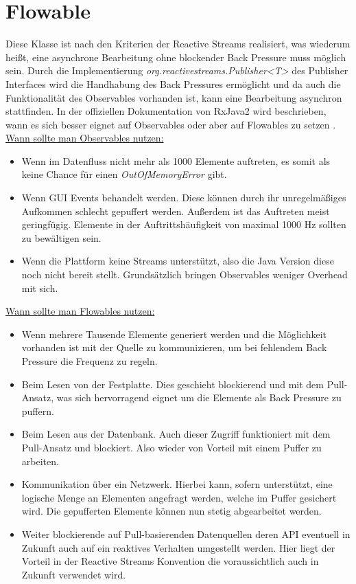 \section{Flowable}
Diese Klasse ist nach den Kriterien der Reactive Streams realisiert, was wiederum heißt, eine asynchrone Bearbeitung ohne blockender Back Pressure muss möglich sein. Durch die Implementierung \textit{org.reactivestreams.Publisher<T>} des Publisher Interfaces wird die Handhabung des Back Pressures ermöglicht und da auch die Funktionalität des Observables vorhanden ist, kann eine Bearbeitung asynchron stattfinden. In der offiziellen Dokumentation von RxJava2 wird beschrieben, wann es sich besser eignet auf Observables oder aber auf Flowables zu setzen \cite{rxdifference}. \underline{Wann sollte man Observables nutzen:}
\begin{itemize}
	\item Wenn im Datenfluss nicht mehr als 1000 Elemente auftreten, es somit als keine Chance für einen \textit{OutOfMemoryError} gibt.
	\item Wenn GUI Events behandelt werden. Diese können durch ihr unregelmäßiges Aufkommen schlecht gepuffert werden. Außerdem ist das Auftreten meist geringfügig. Elemente in der Auftrittshäufigkeit von maximal 1000 Hz sollten zu bewältigen sein.
	\item Wenn die Plattform keine Streams unterstützt, also die Java Version diese noch nicht bereit stellt. Grundsätzlich bringen Observables weniger Overhead mit sich.
\end{itemize} \newpage
\underline{Wann sollte man Flowables nutzen:}
\begin{itemize}
	\item Wenn mehrere Tausende Elemente generiert werden und die Möglichkeit vorhanden ist mit der Quelle zu kommunizieren, um bei fehlendem Back Pressure die Frequenz zu regeln.
	\item Beim Lesen von der Festplatte. Dies geschieht blockierend und mit dem Pull-Ansatz, was sich hervorragend eignet um die Elemente als Back Pressure zu puffern.
	\item Beim Lesen aus der Datenbank. Auch dieser Zugriff funktioniert mit dem Pull-Ansatz und blockiert. Also wieder von Vorteil mit einem Puffer zu arbeiten.
	\item Kommunikation über ein Netzwerk. Hierbei kann, sofern unterstützt, eine logische Menge an Elementen angefragt werden, welche im Puffer gesichert wird. Die gepufferten Elemente können nun stetig abgearbeitet werden.
	\item Weiter blockierende auf Pull-basierenden Datenquellen deren API eventuell in Zukunft auch auf ein reaktives Verhalten umgestellt werden. Hier liegt der Vorteil in der Reactive Streams Konvention die voraussichtlich auch in Zukunft verwendet wird.
\end{itemize}
